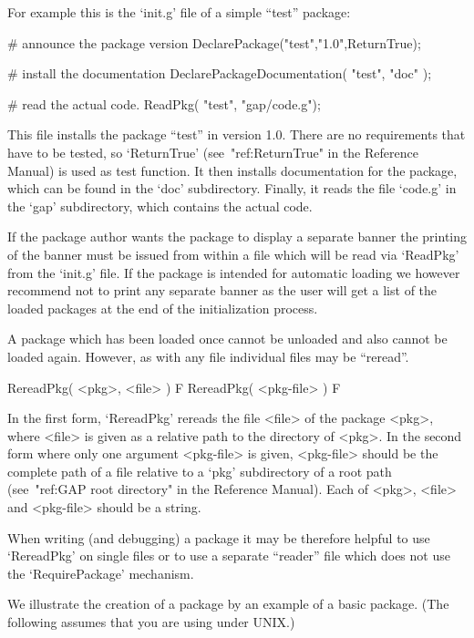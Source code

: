 For example this is the `init.g' file of a simple ``test'' {\GAP} package:

\begintt
# announce the package version
DeclarePackage("test","1.0",ReturnTrue);

# install the documentation
DeclarePackageDocumentation( "test", "doc" );

# read the actual code.
ReadPkg( "test", "gap/code.g");
\endtt

This file installs the {\GAP} package ``test'' in version 1.0. There
are no requirements that have to be tested, so `ReturnTrue'
(see~"ref:ReturnTrue" in the Reference Manual) is used as
test function. It then installs documentation for the package,
which can be found in the `doc' subdirectory. Finally, it reads the
file `code.g' in the `gap' subdirectory, which contains the actual
code.

If the package author wants the {\GAP} package to display a separate
banner the printing of the banner must be issued from within a file
which will be read via `ReadPkg' from the `init.g' file. If the
package is intended for automatic loading we however recommend not to print
any separate banner as the user will get a list of the loaded {\GAP} packages
at the end of the initialization process.

A {\GAP} package which has been loaded once
cannot be unloaded and also cannot be loaded again.
However, as with any file individual files may be ``reread''.

\>RereadPkg( <pkg>, <file> ) F
\>RereadPkg( <pkg-file> ) F

In the first form, `RereadPkg' rereads  the  file  <file>  of  the {\GAP}
package <pkg>, where <file> is given as a relative path to the  directory 
of <pkg>. In the second form where only one argument <pkg-file> is given,
<pkg-file> should be the complete path of a  file  relative  to  a  `pkg'
subdirectory of a {\GAP} root path (see~"ref:GAP root directory"  in  the
Reference Manual). Each of <pkg>,  <file>  and  <pkg-file>  should  be  a
string.

When  writing (and debugging) a {\GAP} package it may be therefore
helpful to use  `RereadPkg' on single  files or to use a separate
``reader'' file which does not use the `RequirePackage' mechanism.


We illustrate the creation of a {\GAP} package by an example of a basic
package. (The following assumes that you are using {\GAP} under UNIX.)

